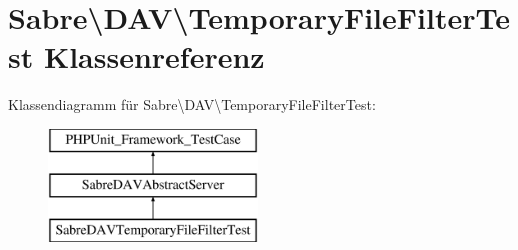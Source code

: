 \hypertarget{class_sabre_1_1_d_a_v_1_1_temporary_file_filter_test}{}\section{Sabre\textbackslash{}D\+AV\textbackslash{}Temporary\+File\+Filter\+Test Klassenreferenz}
\label{class_sabre_1_1_d_a_v_1_1_temporary_file_filter_test}
Klassendiagramm für Sabre\textbackslash{}D\+AV\textbackslash{}Temporary\+File\+Filter\+Test\+:\begin{figure}[H]
\begin{center}
\leavevmode
\includegraphics[height=3.000000cm]{class_sabre_1_1_d_a_v_1_1_temporary_file_filter_test}
\end{center}
\end{figure}
